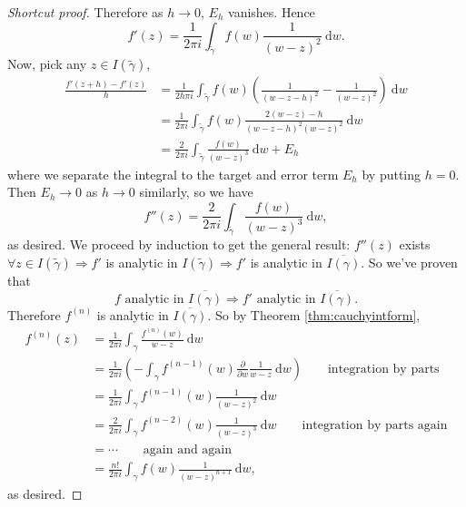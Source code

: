 \documentclass[a4paper]{article}
\theoremstyle{definition}
\begin{document}
\begin{proof}[Shortcut proof]
Therefore as $h\rightarrow 0$, $E_h$ vanishes. Hence
\[
f'(z) = \frac{1}{2\pi i} \int_{\widetilde{\gamma}} f(w) \frac{1}{(w-z)^2} \ \mathrm d w .
\]
Now, pick any $z\in I(\widetilde{\gamma})$,
\[
\begin{aligned}
\frac{f'(z+h)-f'(z)}{h} &= \frac{1}{2h\pi i} \int_{\widetilde{\gamma}} f(w) \left(\frac{1}{(w-z-h)^2}-\frac{1}{(w-z)^2} \right) \ \mathrm d w \\ &=\frac{1}{2\pi i} \int_{\widetilde{\gamma}} f(w) \frac{2(w-z)-h}{(w-z-h)^2(w-z)^2} \ \mathrm d w \\&= \frac{2}{2\pi i} \int_{\widetilde{\gamma}} \frac{f(w)}{(w-z)^3} \ \mathrm d w+E_h
\end{aligned}
\]
where we separate the integral to the target and error term $E_h$ by putting $h=0$. Then $E_h \rightarrow 0$ as $h\rightarrow 0$ similarly, so we have
\[
f''(z) = \frac{2}{2\pi i} \int_{\widetilde{\gamma}} \frac{f(w)}{(w-z)^3} \ \mathrm d w ,
\]
as desired. We proceed by induction to get the general result: $f''(z)$ exists $\forall z\in I(\widetilde{\gamma}) \Rightarrow f'$ is analytic in $I(\widetilde{\gamma}) \Rightarrow f'$ is analytic in $\overline{I(\gamma)}$. So we've proven that
\[
f\text{ analytic in }\overline{I(\gamma)} \Rightarrow f' \text{ analytic in }\overline{I(\gamma)}.
\]
Therefore $f^{(n)}$ is analytic in $\overline{I(\gamma)}$. So by Theorem \ref{thm:cauchyintform},
\[
\begin{aligned}
f^{(n)}(z) &= \frac{1}{2\pi i} \int_\gamma \frac{f^{(n)} (w)}{w-z} \ \mathrm d w \\&= \frac{1}{2\pi i} \left(-\int_\gamma f^{(n-1)} (w) \frac{\partial}{\partial w} \frac{1}{w-z} \ \mathrm d w \right) \qquad \text{integration by parts} \\&= \frac{1}{2\pi i} \int_\gamma f^{(n-1)}(w) \frac{1}{(w-z)^2} \ \mathrm d w \\&= \frac{2}{2\pi i} \int_\gamma f^{(n-2)}(w) \frac{1}{(w-z)^3} \ \mathrm d w \qquad \text{integration by parts again} \\&= \cdots \qquad \text{again and again} \\&= \frac{n!}{2\pi i} \int_\gamma f(w)\frac{1}{(w-z)^{n+1}} \ \mathrm d w,
\end{aligned}
\]
as desired.
\end{proof}
\end{document}
